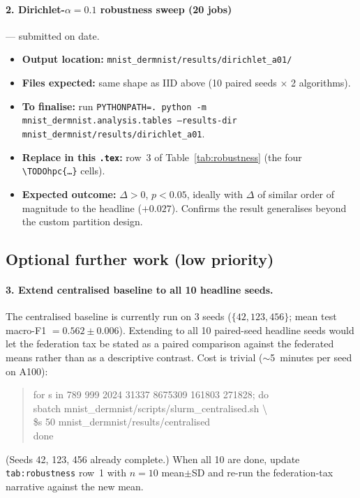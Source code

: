 \documentclass[11pt,a4paper]{report}
\newif\ifshowtodo
\newcommand{\TODOhpc}[1]{%
  \ifshowtodo\textcolor{red}{\textbf{[HPC PENDING: #1]}}\else#1\fi}
\begin{document}
\paragraph{2. Dirichlet-$\alpha = 0.1$ robustness sweep (20 jobs)} ---
submitted on \TODOhpc{date}.
\begin{itemize}
\item \textbf{Output location:} \texttt{mnist\_dermnist/results/dirichlet\_a01/}
\item \textbf{Files expected:} same shape as IID above (10 paired seeds
  $\times$ 2 algorithms).
\item \textbf{To finalise:} run
  \texttt{PYTHONPATH=. python -m mnist\_dermnist.analysis.tables --results-dir mnist\_dermnist/results/dirichlet\_a01}.
\item \textbf{Replace in this \texttt{.tex}:} row~3 of
  Table~\ref{tab:robustness} (the four \texttt{\textbackslash TODOhpc\{\ldots\}} cells).
\item \textbf{Expected outcome:} $\Delta > 0$, $p < 0.05$, ideally with
  $\Delta$ of similar order of magnitude to the headline ($+0.027$).
  Confirms the result generalises beyond the custom partition design.
\end{itemize}

\subsection*{Optional further work (low priority)}

\paragraph{3. Extend centralised baseline to all 10 headline seeds.}
The centralised baseline is currently run on 3 seeds ($\{42, 123, 456\}$;
mean test macro-F1 $= 0.562 \pm 0.006$). Extending to all 10 paired-seed
headline seeds would let the federation tax be stated as a paired
comparison against the federated means rather than as a descriptive
contrast. Cost is trivial ($\sim$5~minutes per seed on A100):
\begin{quote}\small\ttfamily\noindent
for s in 789 999 2024 31337 8675309 161803 271828; do\\
\hspace*{2em}sbatch mnist\_dermnist/scripts/slurm\_centralised.sh \textbackslash\\
\hspace*{4em}\$s 50 mnist\_dermnist/results/centralised\\
done
\end{quote}
(Seeds 42, 123, 456 already complete.) When all 10 are done, update
\texttt{tab:robustness} row~1 with $n = 10$ mean$\pm$SD and re-run the
federation-tax narrative against the new mean.
\end{document}

